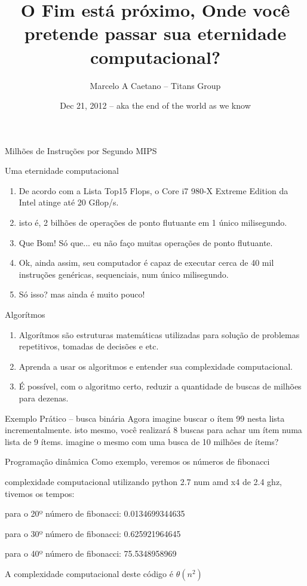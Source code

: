 \documentclass{beamer}
\title[Performance em Python]{O Fim está próximo, Onde você pretende passar sua eternidade computacional?}
\author{Marcelo A Caetano -- Titans Group}
\date{Dec 21, 2012 -- aka the end of the world as we know}
\begin{document}
  \begin{frame}
    \titlepage
  \end{frame}
  \begin{frame}{Milhões de Instruções por Segundo MIPS}
    \begin{block}{Uma eternidade computacional}
      \begin{enumerate}
        \item<1-| alert@1> De acordo com a Lista Top15 Flops, o Core i7 980-X Extreme Edition da Intel atinge até 20 Gflop/s.
        \item<2 -> isto é, 2 bilhões de operações de ponto flutuante em 1 único milisegundo.
        \item<3 -> Que Bom! Só que... eu não faço muitas operações de ponto flutuante.
        \item<4 -> Ok, ainda assim, seu computador é capaz de executar cerca de 40 mil instruções genéricas, sequenciais, num único milisegundo.
        \item<5 -> Só isso? mas ainda é muito pouco!
      \end{enumerate}
    \end{block}
  \end{frame} 
  \begin{frame}{Algorítmos}
    \begin{enumerate}
     \item<1 -> Algorítmos são estruturas matemáticas utilizadas para solução de problemas repetitivos, tomadas de decisões e etc.
     \item<2 -> Aprenda a usar os algoritmos e entender sua complexidade computacional.
     \item<3 -> É possível, com o algoritmo certo, reduzir a quantidade de buscas de milhões para dezenas.
    \end{enumerate}
  \end{frame}
  \begin{frame}{Exemplo Prático -- busca binária}
    Agora imagine buscar o ítem 99 nesta lista incrementalmente.
  isto mesmo, você realizará 8 buscas para achar um ítem numa lista de 9 ítems.
  imagine o  mesmo com uma busca de 10 milhões de ítems?
  \end{frame}
  \begin{frame}{Programação dinâmica}
    Como exemplo, veremos os números de fibonacci
    
  \end{frame}
  \begin{frame}
    \begin{block}{complexidade computacional}
       utilizando python 2.7 num amd x4 de 2.4 ghz, tivemos os tempos:

       para o 20º número de fibonacci: 0.0134699344635

       para o 30º número de fibonacci: 0.625921964645

       para o 40º número de fibonacci: 75.5348958969

    \end{block}

       A complexidade computacional deste código é 
       $\theta(n^{2})$
  \end{frame}
\end{document}
